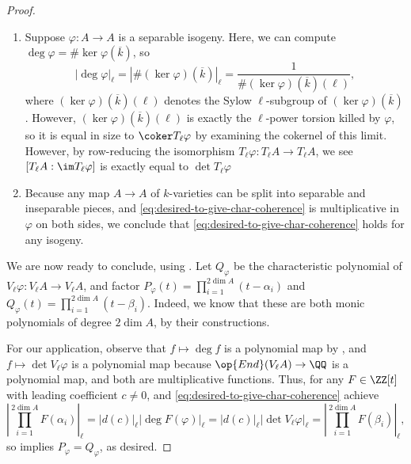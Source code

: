 \documentclass{amsart}
\begin{document}
\begin{proof}
\begin{enumerate}
		On the other hand, it is a fact that $\ker\varphi$ is a $p$-group. Note that this is not entirely obvious due to inseparability, and we will not show it here, instead referencing to \cite[Exercise~4.4]{egm-av}.\footnote{This fact is used to show that isogenies form a reflexive relation, so it can be considered as ``basic'' as that, though the correct proof requires an understanding of finite group schemes.} The point is that $\varphi$ has no $\ell$-power-torsion, so $\varphi\colon A\left[\ell^\nu\right]\to A\left[\ell^\nu\right]$ is always an isomorphism, so $T_\ell\varphi\colon T_\ell A\to T_\ell A$ is an isomorphism. As such, the determinant of the map $V_\ell[d]$ had better live in $\ZZ_\ell^\times$ (because $V_\ell[d]$ arises from an isomorphism of $\ZZ_\ell$-modules), yielding $\left|\deg V_\ell\varphi\right|_\ell=1$ as well.
		\item Suppose $\varphi\colon A\to A$ is a separable isogeny. Here, we can compute $\deg\varphi=\#\ker\varphi(\overline k)$, so
		\[\left|\deg\varphi\right|_\ell=\left|\#(\ker\varphi)(\overline k)\right|_\ell=\frac1{\#(\ker\varphi)(\overline k)(\ell)},\]
		where $(\ker\varphi)(\overline k)(\ell)$ denotes the Sylow $\ell$-subgroup of $(\ker\varphi)(\overline k)$. However, $(\ker\varphi)(\overline k)(\ell)$ is exactly the $\ell$-power torsion killed by $\varphi$, so it is equal in size to $\coker T_\ell\varphi$ by examining the cokernel of this limit. However, by row-reducing the isomorphism $T_\ell\varphi\colon T_\ell A\to T_\ell A$, we see $[T_\ell A:\im T_\ell\varphi]$ is exactly equal to $\det T_\ell\varphi$
		\item Because any map $A\to A$ of $k$-varieties can be split into separable and inseparable pieces, and \eqref{eq:desired-to-give-char-coherence} is multiplicative in $\varphi$ on both sides, we conclude that \eqref{eq:desired-to-give-char-coherence} holds for any isogeny.
	\end{enumerate}
	We are now ready to conclude, using . Let $Q_{\varphi}$ be the characteristic polynomial of $V_\ell\varphi\colon V_\ell A\to V_\ell A$, and factor $P_\varphi(t)=\prod_{i=1}^{2\dim A}(t-\alpha_i)$ and $Q_\varphi(t)=\prod_{i=1}^{2\dim A}(t-\beta_i)$. Indeed, we know that these are both monic polynomials of degree $2\dim A$, by their constructions.
	
	For our application, observe that $f\mapsto\deg f$ is a polynomial map by , and $f\mapsto\det V_\ell\varphi$ is a polynomial map because $\op{End}(V_\ell A)\to\QQ$ is a polynomial map, and both are multiplicative functions. Thus, for any $F\in\ZZ[t]$ with leading coefficient $c\ne0$,  and \eqref{eq:desired-to-give-char-coherence} achieve
	\[\left|\prod_{i=1}^{2\dim A}F(\alpha_i)\right|_\ell=\left|d(c)\right|_\ell\left|\deg F(\varphi)\right|_\ell=\left|d(c)\right|_\ell\left|\det V_\ell\varphi\right|_\ell=\left|\prod_{i=1}^{2\dim A}F(\beta_i)\right|_\ell,\]
	so  implies $P_\varphi=Q_\varphi$, as desired.
\end{proof}
\end{document}
